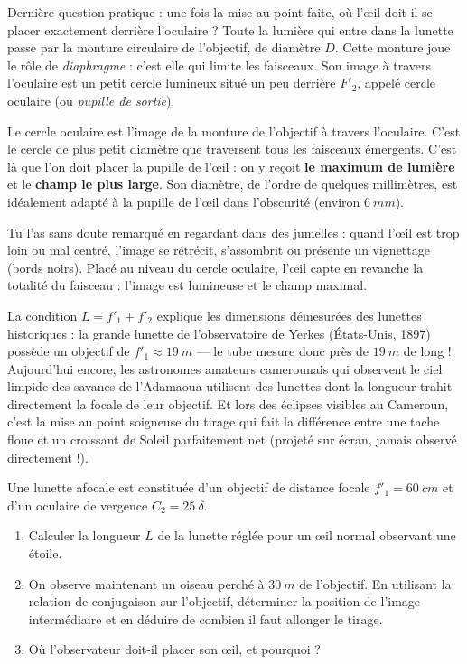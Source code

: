 \documentclass[11pt]{article}
\newcommand{\cle}[1]{{\popxbold\color{popdark}#1}}
\newcounter{popsec}
\newcounter{popsub}
\newcommand{\courssub}[1]{%
  \stepcounter{popsub}%
  \par\vspace{9pt}\noindent{\popxbold\fontsize{11.5}{13}\selectfont\color{popink}{\color{poporange}\thepopsec.\thepopsub}\hspace{6pt}#1}\par\nopagebreak\vspace{4pt}
}
\begin{document}
\courssub{Le cercle oculaire : où placer l'œil ?}

Dernière question pratique : une fois la mise au point faite, où l'œil doit-il se placer exactement derrière l'oculaire ? Toute la lumière qui entre dans la lunette passe par la monture circulaire de l'objectif, de diamètre $D$. Cette monture joue le rôle de \emph{diaphragme} : c'est elle qui limite les faisceaux. Son image à travers l'oculaire est un petit cercle lumineux situé un peu derrière $F'_2$, appelé \cle{cercle oculaire} (ou \emph{pupille de sortie}).

\begin{aretenir}
Le \cle{cercle oculaire} est l'image de la monture de l'objectif à travers l'oculaire. C'est le cercle de plus petit diamètre que traversent tous les faisceaux émergents. C'est là que l'on doit placer la pupille de l'œil : on y reçoit \textbf{le maximum de lumière} et le \textbf{champ le plus large}. Son diamètre, de l'ordre de quelques millimètres, est idéalement adapté à la pupille de l'œil dans l'obscurité (environ $\SI{6}{mm}$).
\end{aretenir}

Tu l'as sans doute remarqué en regardant dans des jumelles : quand l'œil est trop loin ou mal centré, l'image se rétrécit, s'assombrit ou présente un vignettage (bords noirs). Placé au niveau du cercle oculaire, l'œil capte en revanche la totalité du faisceau : l'image est lumineuse et le champ maximal.

\begin{savaistu}
La condition $L = f'_1 + f'_2$ explique les dimensions démesurées des lunettes historiques : la grande lunette de l'observatoire de Yerkes (États-Unis, 1897) possède un objectif de $f'_1 \approx \SI{19}{m}$ — le tube mesure donc près de $\SI{19}{m}$ de long ! Aujourd'hui encore, les astronomes amateurs camerounais qui observent le ciel limpide des savanes de l'Adamaoua utilisent des lunettes dont la longueur trahit directement la focale de leur objectif. Et lors des éclipses visibles au Cameroun, c'est la mise au point soigneuse du tirage qui fait la différence entre une tache floue et un croissant de Soleil parfaitement net (projeté sur écran, jamais observé directement !).
\end{savaistu}

\begin{exercice}
Une lunette afocale est constituée d'un objectif de distance focale $f'_1 = \SI{60}{cm}$ et d'un oculaire de vergence $C_2 = \num{25}\ \delta$.
\begin{enumerate}
\item Calculer la longueur $L$ de la lunette réglée pour un œil normal observant une étoile.
\item On observe maintenant un oiseau perché à $\SI{30}{m}$ de l'objectif. En utilisant la relation de conjugaison sur l'objectif, déterminer la position de l'image intermédiaire et en déduire de combien il faut allonger le tirage.
\item Où l'observateur doit-il placer son œil, et pourquoi ?
\end{enumerate}
\end{exercice}
\end{document}
